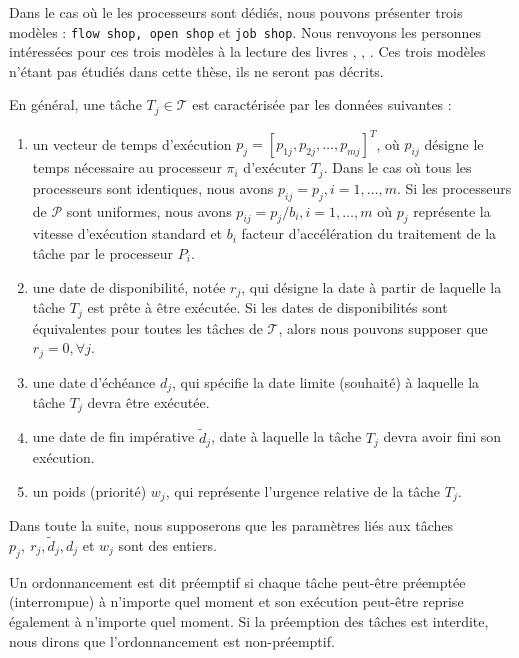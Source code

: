 \documentclass[a4paper,11pt]{article}
\begin{document}
Dans le cas où le les processeurs sont dédiés, nous pouvons présenter trois modèles : \texttt{flow
shop, open shop} et \texttt{job shop}. Nous renvoyons les personnes intéressées pour ces trois
modèles à la lecture des livres \cite{handbook}, \cite{brucker},  \cite{pinedo}. Ces trois modèles
n'étant pas étudiés dans cette thèse, ils ne seront pas décrits.


En général, une tâche $T_j \in \mathcal{T}$ est caractérisée par les données suivantes :

\begin{enumerate}
    \item un vecteur de temps d'exécution $p_j=[p_{1j}, p_{2j},\ldots,p_{mj}]^T$, où $p_{ij}$
        désigne le temps nécessaire au processeur $\pi_i$ d'exécuter $T_j$. Dans le cas où tous les
        processeurs sont identiques, nous avons $p_{ij}=p_j, i=1,\ldots,m$. Si les processeurs de
        $\mathcal{P}$ sont uniformes, nous avons $p_{ij}=p_j/b_i, i=1,\ldots,m$ où $p_j$ représente
        la vitesse d'exécution standard  et $b_i$ facteur d'accélération du traitement de la tâche
        par le processeur $P_i$.
    \item une date de disponibilité, notée $r_j$, qui désigne la date à partir de laquelle la tâche
        $T_j$ est prête à être exécutée. Si les dates de disponibilités sont équivalentes pour
        toutes les tâches de $\mathcal{T}$, alors nous pouvons supposer que $r_j=0, \forall j$.

    \item une date d'échéance $d_j$, qui spécifie la date limite (souhaité) à laquelle la tâche $T_j$ devra être exécutée.
    \item une date de fin impérative $\tilde{d}_j$, date à laquelle la tâche $T_j$ devra avoir fini son exécution.
    \item un poids (priorité) $w_j$, qui représente l'urgence relative de la tâche $T_j$.
\end{enumerate}

Dans toute la suite, nous supposerons que les paramètres liés aux tâches $p_j, ~r_j, \tilde{d}_j,
d_j$ et $w_j$ sont des entiers. %


Un ordonnancement est dit préemptif si chaque tâche peut-être préemptée (interrompue) à n'importe
quel moment et son exécution peut-être reprise également à n'importe quel moment. Si la préemption
des tâches est interdite, nous dirons que l'ordonnancement est non-préemptif.
\end{document}
